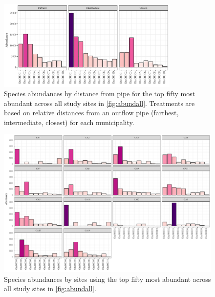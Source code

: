 \documentclass[letterpaper,12pt]{article}\usepackage[]{graphicx}\usepackage[]{color}
\newenvironment{knitrout}{}{} %
\begin{document}
\begin{knitrout}
\color{fgcolor}\begin{figure}[!ht]

{\centering \includegraphics[width=0.8\textwidth]{figs/abundcont-1} 

}

\caption{Species abundances by distance from pipe for the top fifty most abundant across all study sites in \cref{fig:abundall}.  Treatments are based on relative distances from an outflow pipe (farthest, intermediate, closest) for each municipality.}\label{fig:abundcont}
\end{figure}


\end{knitrout}
\clearpage

\begin{landscape}
\centering\vspace*{\fill}
\begin{knitrout}
\color{fgcolor}\begin{figure}[!ht]

{\centering \includegraphics[width=1.1\textwidth]{figs/abundsite-1} 

}

\caption{Species abundances by sites using the top fifty most abundant across all study sites in \cref{fig:abundall}.}\label{fig:abundsite}
\end{figure}


\end{knitrout}
\end{landscape}
\clearpage
\end{document}
